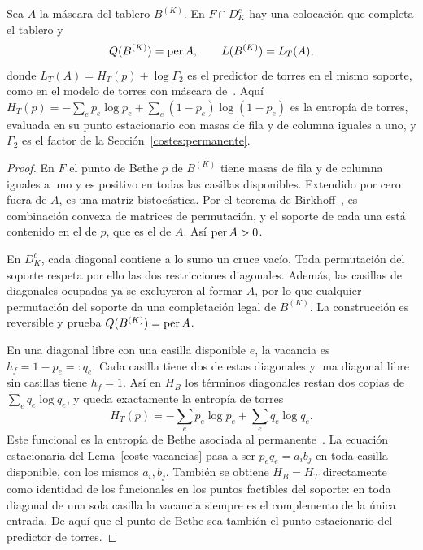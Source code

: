 \begin{lema}\label{terminal-pivotes}
Sea $A$ la máscara del tablero $B^{(K)}$. En $F\cap D_K^c$ hay una
colocación que completa el tablero y
\[
 Q(B^{(K)})=\operatorname{per} A,\qquad L(B^{(K)})=L_T(A),
\]
donde $L_T(A)=H_T(p)+\log\Gamma_2$ es el predictor de torres en el mismo soporte, como en el modelo
de torres con máscara de~\cite[Secciones~8.1 y~8.5]{pred}. Aquí $H_T(p)=-\sum_e p_e\log p_e
+\sum_e(1-p_e)\log(1-p_e)$ es la entropía de torres, evaluada en su punto estacionario con masas
de fila y de columna iguales a uno, y $\Gamma_2$ es el factor de la
Sección~\ref{costes:permanente}.
\end{lema}
\begin{proof}
En $F$ el punto de Bethe $p$ de $B^{(K)}$ tiene masas de fila y de columna iguales a uno y es positivo en
todas las casillas disponibles. Extendido por cero fuera de $A$, es una matriz bistocástica. Por el
teorema de Birkhoff~\cite{birkhoff}, es combinación convexa de matrices de permutación, y el soporte
de cada una está contenido en el de $p$, que es el de $A$. Así $\operatorname{per} A>0$.

En $D_K^c$, cada diagonal contiene a lo sumo un cruce vacío. Toda permutación del
soporte respeta por ello las dos restricciones diagonales. Además, las casillas de diagonales ocupadas
ya se excluyeron al formar $A$, por lo que cualquier permutación del soporte da una completación legal
de $B^{(K)}$. La construcción es reversible y prueba $Q(B^{(K)})=\operatorname{per} A$.

En una diagonal libre con una casilla disponible $e$, la vacancia es $h_f=1-p_e=:q_e$. Cada casilla
tiene dos de estas diagonales y una diagonal libre sin casillas tiene $h_f=1$. Así en $H_B$ los
términos diagonales restan dos copias de $\sum_e q_e\log q_e$, y queda exactamente la entropía de
torres
\[
 H_T(p)=-\sum_e p_e\log p_e+\sum_e q_e\log q_e .
\]
Este funcional es la entropía de Bethe asociada al permanente~\cite{vontobel}.
La ecuación estacionaria del Lema~\ref{coste-vacancias} pasa a ser $p_eq_e=a_ib_j$ en toda casilla
disponible, con los mismos $a_i,b_j$. También se obtiene $H_B=H_T$
directamente como identidad de los funcionales en los puntos factibles del soporte: en toda diagonal
de una sola casilla la vacancia siempre es el complemento de la única entrada. De aquí que el punto
de Bethe sea también el punto estacionario del predictor de torres.


\end{proof}
